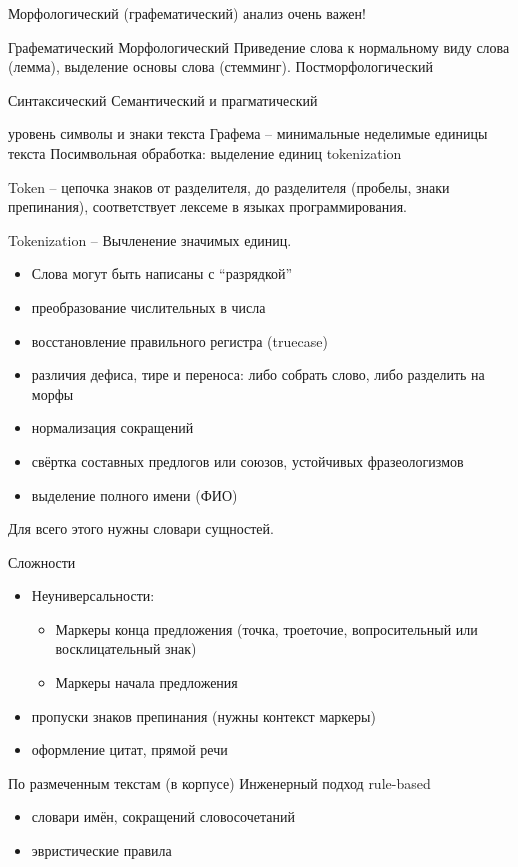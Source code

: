 \documentclass[a4paper]{article}
\newcommand{\eng}[1]{\foreignlanguage{english}{#1}}
\begin{document}


Морфологический (графематический) анализ очень важен!

Графематический
Морфологический
	Приведение слова к нормальному виду слова (лемма), выделение основы слова (стемминг).
Постморфологический

Синтаксический
Семантический и прагматический

уровень символы и знаки текста
Графема -- минимальные неделимые единицы текста
Посимвольная обработка: выделение единиц \eng{tokenization}

\eng{Token} -- цепочка знаков от разделителя, до разделителя (пробелы, знаки препинания), соответствует лексеме в языках программирования.

\eng{Tokenization} -- Вычленение значимых единиц.

\begin{itemize}
	\item Слова могут быть написаны с ``разрядкой''
	\item преобразование числительных в числа
	\item восстановление правильного регистра (\eng{truecase})
	\item различия дефиса, тире и переноса: либо собрать слово, либо разделить на морфы
	\item нормализация сокращений
	\item свёртка составных предлогов или союзов, устойчивых фразеологизмов
	\item выделение полного имени (ФИО)
\end{itemize}
Для всего этого нужны словари сущностей.

Сложности
\begin{itemize}
	\item Неуниверсальности:
	\begin{itemize}
		\item Маркеры конца предложения (точка, троеточие, вопросительный или восклицательный знак)
		\item Маркеры начала предложения
	\end{itemize}
	\item пропуски знаков препинания (нужны контекст маркеры)
	\item оформление цитат, прямой речи
\end{itemize}

По размеченным текстам (в корпусе)
Инженерный подход \eng{rule-based}
\begin{itemize}
	\item словари имён, сокращений словосочетаний
	\item эвристические правила
\end{itemize}
\end{document}
